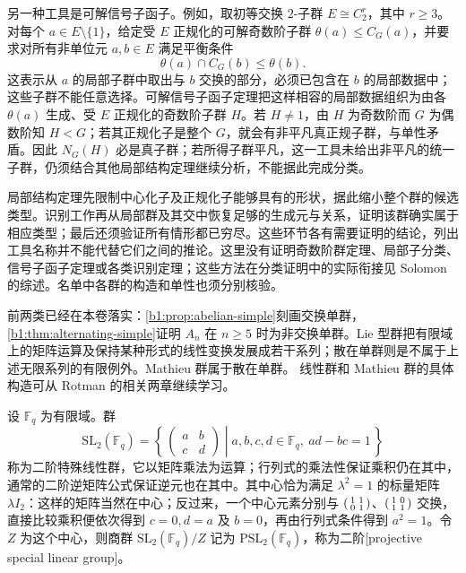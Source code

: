 \ProseParagraphBreak
另一种工具是可解信号子函子。例如，取初等交换 \(2\)-子群 \(E\cong C_2^r\)，其中 \(r\geq3\)。对每个 \(a\in E\setminus\{1\}\)，给定受 \(E\) 正规化的可解奇数阶子群 \(\theta(a)\leq C_G(a)\)，并要求对所有非单位元 \(a,b\in E\) 满足平衡条件
\[
	\theta(a)\cap C_G(b)\leq\theta(b).
\]
这表示从 \(a\) 的局部子群中取出与 \(b\) 交换的部分，必须已包含在 \(b\) 的局部数据中；这些子群不能任意选择。可解信号子函子定理把这样相容的局部数据组织为由各 \(\theta(a)\) 生成、受 \(E\) 正规化的奇数阶子群 \(H\)\cite[Solvable Signalizer Functor Theorem]{Solomon2001SimpleGroupsHistory}。若 \(H\ne1\)，由 \(H\) 为奇数阶而 \(G\) 为偶数阶知 \(H<G\)；若其正规化子是整个 \(G\)，就会有非平凡真正规子群，与单性矛盾。因此 \(N_G(H)\) 必是真子群；若所得子群平凡，这一工具未给出非平凡的统一子群，仍须结合其他局部结构定理继续分析，不能据此完成分类。

\ProseParagraphBreak
局部结构定理先限制中心化子及正规化子能够具有的形状，据此缩小整个群的候选类型。识别工作再从局部群及其交中恢复足够的生成元与关系，证明该群确实属于相应类型；最后还须验证所有情形都已穷尽。这些环节各有需要证明的结论，列出工具名称并不能代替它们之间的推论。这里没有证明奇数阶群定理、局部子分类、信号子函子定理或各类识别定理；这些方法在分类证明中的实际衔接见 Solomon 的综述\cite[Gorenstein--Lyons Trichotomy Theorem and surrounding discussion]{Solomon2001SimpleGroupsHistory}。名单中各群的构造和单性也须分别核验。

\ProseParagraphBreak
前两类已经在本卷落实：\cref{b1:prop:abelian-simple}刻画交换单群，\cref{b1:thm:alternating-simple}证明 \(A_n\) 在 \(n\geq5\) 时为非交换单群。Lie 型群把有限域上的矩阵运算及保持某种形式的线性变换发展成若干系列；散在单群则是不属于上述无限系列的有限例外。Mathieu 群属于散在单群。 线性群和 Mathieu 群的具体构造可从 Rotman 的相关两章继续学习\cite[Chapter 8, Some Simple Linear Groups; Chapter 9, Permutations and the Mathieu Groups]{Rotman1995TheoryGroups}。

\ProseParagraphBreak
设 \(\mathbb F_q\) 为有限域。群
\[
	\mathrm{SL}_2(\mathbb F_q)
	=\left\{\,\begin{pmatrix}a&b\\c&d\end{pmatrix}
	\mathrel{}\middle|\mathrel{}a,b,c,d\in\mathbb F_q,\ ad-bc=1\,\right\}
\]
称为二阶特殊线性群，它以矩阵乘法为运算；行列式的乘法性保证乘积仍在其中，通常的二阶逆矩阵公式保证逆元也在其中。其中心恰为满足 \(\lambda^2=1\) 的标量矩阵 \(\lambda I_2\)：这样的矩阵当然在中心；反过来，一个中心元素分别与 \(\begin{psmallmatrix}1&1\\0&1\end{psmallmatrix}\)、\(\begin{psmallmatrix}1&0\\1&1\end{psmallmatrix}\) 交换，直接比较乘积便依次得到 \(c=0,d=a\) 及 \(b=0\)，再由行列式条件得到 \(a^2=1\)。令 \(Z\) 为这个中心，则商群 \(\mathrm{SL}_2(\mathbb F_q)/Z\) 记为 \(\mathrm{PSL}_2(\mathbb F_q)\)，称为二阶[projective special linear group]。

